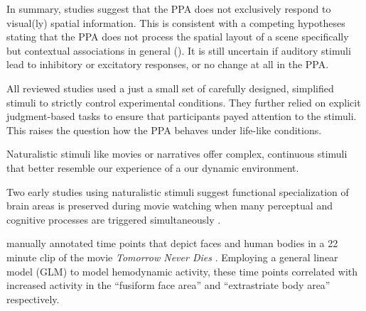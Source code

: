 \documentclass[english]{article}
\begin{document}

In summary, studies suggest that the PPA does not exclusively respond to
visual(ly) spatial information. This is consistent with a competing hypotheses
stating that the PPA does not process the spatial layout of a scene specifically
but contextual associations in general (\citep{aminoff2006parahippocampal,
aminoff2013role}). It is still uncertain if auditory stimuli lead to inhibitory
or excitatory responses, or no change at all in the PPA.


All reviewed studies used a just a small set of carefully designed, simplified
stimuli to strictly control experimental conditions. They further relied on
explicit judgment-based tasks to ensure that participants payed attention to
the stimuli. This raises the question how the PPA behaves under life-like conditions.

Naturalistic stimuli like movies \citep{hasson2008neurocinematics,
sonkusare2019naturalistic} or narratives \citep{honey2012not,
lerner2011topographic, silbert2014coupled} offer complex, continuous stimuli
that better resemble our experience of a our dynamic environment.

Two early studies using naturalistic stimuli suggest functional specialization
of brain areas is preserved during movie watching when many perceptual and
cognitive processes are triggered simultaneously \citep{bartels2004mapping, hasson2004intersubject}.

\citep{bartels2004mapping} manually annotated time points that depict faces and
human bodies in a 22 minute clip of the movie \textit{Tomorrow Never Dies}
\citep{tomorrowneverdies}.
Employing a general linear model (GLM) to model hemodynamic activity, these time
points correlated with increased activity in the ``fusiform face area''
\citep{kanwisher1997ffa} and ``extrastriate body area''
\citep{downing2001bodyarea} respectively.
\end{document}
